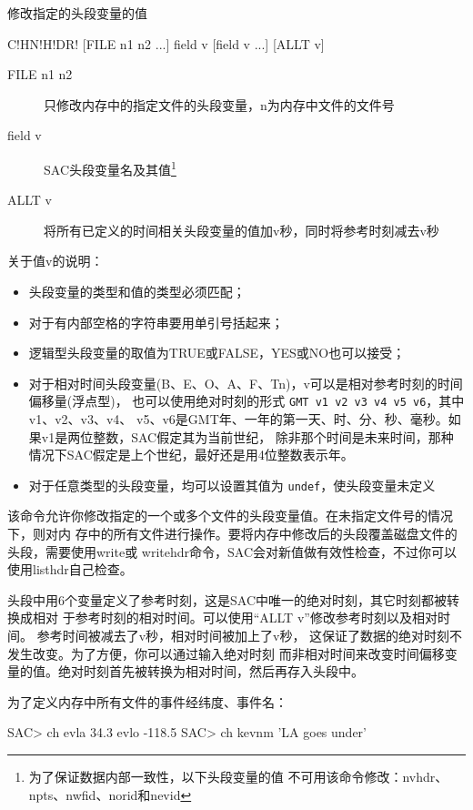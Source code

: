 \label{cmd:chnhdr}

修改指定的头段变量的值

\begin{SACSTX}
C!HN!H!DR! [FILE n1 n2 ...] field v [field v ...] [ALLT v]
\end{SACSTX}

\begin{description}
\item [FILE n1 n2] 只修改内存中的指定文件的头段变量，n为内存中文件的文件号
\item [field v] SAC头段变量名及其值\footnote{为了保证数据内部一致性，以下头段变量的值
    不可用该命令修改：nvhdr、npts、nwfid、norid和nevid}
\item [ALLT v] 将所有已定义的时间相关头段变量的值加v秒，同时将参考时刻减去v秒
\end{description}

关于值v的说明：
\begin{itemize}
\item 头段变量的类型和值的类型必须匹配；
\item 对于有内部空格的字符串要用单引号括起来；
\item 逻辑型头段变量的取值为TRUE或FALSE，YES或NO也可以接受；
\item 对于相对时间头段变量(B、E、O、A、F、Tn)，v可以是相对参考时刻的时间偏移量(浮点型)，
    也可以使用绝对时刻的形式 \texttt{GMT v1 v2 v3 v4 v5 v6}，其中v1、v2、v3、v4、
    v5、v6是GMT年、一年的第一天、时、分、秒、毫秒。如果v1是两位整数，SAC假定其为当前世纪，
    除非那个时间是未来时间，那种情况下SAC假定是上个世纪，最好还是用4位整数表示年。
\item 对于任意类型的头段变量，均可以设置其值为 \texttt{undef}，使头段变量未定义
\end{itemize}

该命令允许你修改指定的一个或多个文件的头段变量值。在未指定文件号的情况下，则对内
存中的所有文件进行操作。要将内存中修改后的头段覆盖磁盘文件的头段，需要使用write或
writehdr命令，SAC会对新值做有效性检查，不过你可以使用listhdr自己检查。

头段中用6个变量定义了参考时刻，这是SAC中唯一的绝对时刻，其它时刻都被转换成相对
于参考时刻的相对时间。可以使用``ALLT v''修改参考时刻以及相对时间。
参考时间被减去了v秒，相对时间被加上了v秒，
这保证了数据的绝对时刻不发生改变。为了方便，你可以通过输入绝对时刻
而非相对时间来改变时间偏移变量的值。绝对时刻首先被转换为相对时间，然后再存入头段中。

为了定义内存中所有文件的事件经纬度、事件名：
\begin{SACCode}
SAC> ch evla 34.3 evlo -118.5
SAC> ch kevnm 'LA goes under'
\end{SACCode}

